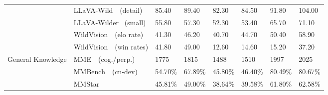 \begin{table}[t!]
{\begin{tabular}{p{1.5cm}p{3cm}p{1.5cm}p{1.6cm}p{1.5cm}p{1.6cm}p{1.5cm}p{1.6cm}}
     & LLaVA-Wild~\cite{liu2023visual}~\tiny{(detail)} \newline \tiny{\color{light-gray}{Realworld Chat}} & 85.40 & \cellcolor{front-color} 89.40 \tiny{\color{brown}{+4.00}} & 82.30 & \cellcolor{front-color} 84.50 \tiny{\color{brown}{+2.20}} & 91.80 & \cellcolor{front-color}104.00 \tiny{\color{brown}{+12.20}} \\
     & LLaVA-Wilder~\cite{li2024llavanext-strong} (small) \newline \tiny{\color{light-gray}{Realworld Chat}} & 55.80 & \cellcolor{front-color} 57.30 \tiny{\color{brown}{+1.50}} & 52.30 & \cellcolor{front-color} 53.40 \tiny{\color{brown}{+1.10}} & 65.70 & \cellcolor{front-color}71.10 \tiny{\color{brown}{+5.40}} \\
     & WildVision~\cite{lu2024wildvision}~\tiny{(elo rate)} \newline \tiny{\color{light-gray}{Model Competition}} & 41.30 & \cellcolor{front-color} 46.20 \tiny{\color{brown}{+4.90}} & 40.70 & \cellcolor{front-color} 44.70 \tiny{\color{brown}{+4.00}} & 50.40 & \cellcolor{front-color}58.90 \tiny{\color{brown}{+8.50}} \\
    & WildVision~\cite{lu2024wildvision}~\tiny{(win rates)} \newline \tiny{\color{light-gray}{Model Competition}} & 41.80 & \cellcolor{front-color} 49.00 \tiny{\color{brown}{+7.20}} & 12.60 & \cellcolor{front-color} 14.60 \tiny{\color{brown}{+2.00}} & 15.20 & \cellcolor{front-color}37.20 \tiny{\color{brown}{+22.00}} \\
    \cmidrule{2-8}
    \multirow{5}{*}{\parbox{1.5cm}{General Knowledge}} 
     & MME~\cite{fu2023mme}~\tiny{(cog./perp.)} \newline \tiny{\color{light-gray}{Multi-discip}} & 1775 & \cellcolor{front-color} 1815 \tiny{\color{brown}{+40}} & 1488 & \cellcolor{front-color} 1510 \tiny{\color{brown}{+22}} & 1997 & \cellcolor{front-color}2025 \tiny{\color{brown}{+28}} \\
    & MMBench~\cite{liu2023mmbench}~\tiny{(cn-dev)} \newline \tiny{\color{light-gray}{Multi-discip}} & 54.70\tiny{\%} & \cellcolor{front-color} 67.89\tiny{\%} \tiny{\color{brown}{+13.19\%}} & 45.80\tiny{\%} & \cellcolor{front-color} 46.40\tiny{\%} \tiny{\color{brown}{+0.60\%}} & 80.49\tiny{\%} & \cellcolor{front-color}80.67\tiny{\%} \tiny{\color{brown}{+0.18\%}} \\
    & MMStar~\cite{chen2024we} \newline \tiny{\color{light-gray}{Multi-discip}} & 45.81\tiny{\%} & \cellcolor{front-color} 49.00\tiny{\%} \tiny{\color{brown}{+3.19\%}} & 38.64\tiny{\%} & \cellcolor{front-color} 39.58\tiny{\%} \tiny{\color{brown}{+0.94\%}} & 61.80\tiny{\%} & \cellcolor{front-color}62.58\tiny{\%} \tiny{\color{brown}{+0.78\%}} \\

\end{tabular}}
\end{table}
